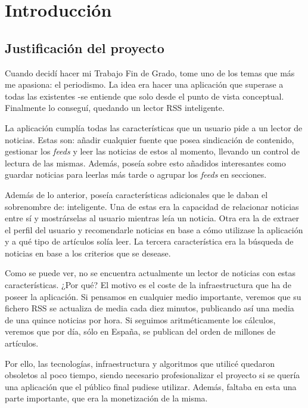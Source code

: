 
\chapter{Introducción}\label{introduccion}
\section{Justificación del proyecto}\label{sec:justificacion}

Cuando decidí hacer mi Trabajo Fin de Grado, tome uno de los temas que más me apasiona: el periodismo. La idea era hacer una aplicación que superase a todas las existentes -se entiende que solo desde el punto de vista conceptual. Finalmente lo conseguí, quedando un lector RSS inteligente.

La aplicación cumplía todas las características que un usuario pide a un lector de noticias. Estas son: añadir cualquier fuente que posea sindicación de contenido, gestionar los \textit{feeds} y leer las noticias de estos al momento, llevando un control de lectura de las mismas. Además, poseía sobre esto añadidos interesantes como guardar noticias para leerlas más tarde o agrupar los \textit{feeds} en secciones.

Además de lo anterior, poseía características adicionales que le daban el sobrenombre de: inteligente. Una de estas era la capacidad de relacionar noticias entre sí y mostrárselas al usuario mientras leía un noticia. Otra era la de extraer el perfil del usuario y recomendarle noticias en base a cómo utilizase la aplicación y a qué tipo de artículos solía leer. La tercera característica era la búsqueda de noticias en base a los criterios que se desease.

Como se puede ver, no se encuentra actualmente un lector de noticias con estas características. ¿Por qué? El motivo es el coste de la infraestructura que ha de poseer la aplicación. Si pensamos en cualquier medio importante, veremos que su fichero RSS se actualiza de media cada diez minutos, publicando así una media de una quince noticias por hora. Si seguimos aritméticamente los cálculos, veremos que por día, sólo en España, se publican del orden de millones de artículos.

Por ello, las tecnologías, infraestructura y algoritmos que utilicé quedaron obsoletos al poco tiempo, siendo necesario profesionalizar el proyecto si se quería una aplicación que el público final pudiese utilizar. Además, faltaba en esta una parte importante, que era la monetización de la misma.

